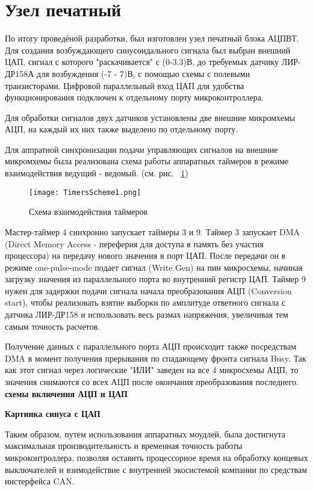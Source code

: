 \section{Узел печатный}

По итогу проведёной разработки, был изготовлен узел печатный блока АЦПВТ. Для создания возбуждающего синусоидального сигнала был выбран внешний ЦАП, сигнал с которого "раскачивается" с (0-3.3)В,
до требуемых датчику ЛИР-ДР158А для возбуждения (-7 - 7)В, с помощью схемы с полевыми транзисторами. Цифровой параллельный вход ЦАП для удобства функционирования подключен 
к отдельному порту микроконтроллера. 

Для обработки сигналов двух датчиков установлены две внешние микромхемы АЦП, на каждый их них также выделено по отдельному порту. 

Для аппратной синхронизации подачи управляющих сигналов на внешние микромхемы была реализована схема 
работы аппаратных таймеров в режиме взаимодействия ведущий - ведомый. (см. рис. ~\ref{Timers})

\begin{figure}[!h]
  \centering
  \texttt{[image: TimersScheme1.png]} 
  \caption{Схема взаимодействия таймеров}
  \label{Timers}
\end{figure}

Мастер-таймер 4 синхронно запускает таймеры 3 и 9. Таймер 3 запускает DMA (Direct Memory Access - переферия для доступа в память без участия процессора) на передачу нового значения в порт ЦАП.
После передачи он в режиме one-pulse-mode подает сигнал (Write Gen) на пин микросхемы, начиная загрузку значения из параллельного порта во внутренний регистр ЦАП. Таймер 9 нужен для задержки подачи
сигнала начала преобразования АЦП (Conversion start), чтобы реализовать взятие выборки по амплитуде ответного сигнала с датчика ЛИР-ДР158 и  использовать весь размах напряжения, 
увеличивая тем самым точность расчетов.

Получение данных с параллельного порта АЦП происходит также посредствам DMA в момент получения прерывания по спадающему фронта сигнала Busy. Так как этот сигнал через логические "ИЛИ" 
заведен на все 4 микросхемы АЦП, то значения снимаются со всех АЦП после окончания преобразования последнего. 
\textbf{схемы включения АЦП и ЦАП}

\textbf{Картинка синуса с ЦАП}

Таким образом, путем использования аппаратных моудлей, была достигнута максимальная производительность и временная точность работы микроконтроллера, 
позволяя оставить процессорное время на обработку концевых выключателей и взимодействие с внутренней экосистемой компании по средствам инстерфейса CAN.

